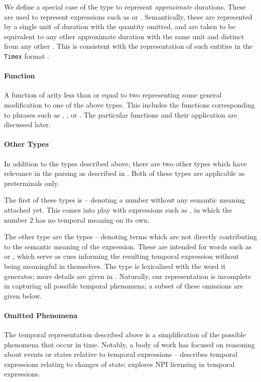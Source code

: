 We define a special case of the  type to represent 
	\textit{approximate} durations.
These are used to represent expressions such as  or
	.
Semantically, these are represented by a single unit of duration with the
	quantity omitted, and are taken to be equivalent to any other approximate
	duration with the same unit and distinct from any other .
This is consistent with the representation of such entities in the
	\texttt{Timex} format \cite{key:2003pustejovsky-timeml}.

\paragraph{Function}
A function of arity less than or equal to two representing some
	general modification to one of the above types.
This includes the functions corresponding to phrases such as
	, , or .
The particular functions and their application are discussed later.


\paragraph{Other Types}
In addition to the types described above, there are two other types which
	have relevance in the parsing as described in .
Both of these types are applicable as preterminals only.

The first of these types is  -- denoting a number without
	any semantic meaning attached yet.
This comes into play with expressions such as , in which
	the number $2$ has no temporal meaning on its own.

The other type are the  types -- denoting terms which are not
	directly contributing to the semantic meaning of the expression.
These are intended for words such as  or , which serve as cues
	informing the resulting temporal expression without being meaningful
	in themselves.
The  type is lexicalized with the word it generates; more details
	are given in .
Naturally, our representation is incomplete in capturing all possible
	temporal phenomena; a subset of these omissions are given below.


\paragraph{Omitted Phenomena}
The temporal representation described above is a simplification of the
	possible phenomena that occur in time.
Notably, a body of work has focused on reasoning about events or states
	relative to temporal expressions -- 
	 describes temporal expressions relating to
	changes of state; 
	 explores NPI licensing in temporal
	expressions.

